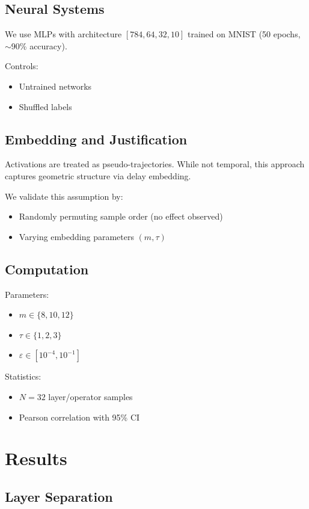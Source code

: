 \documentclass[11pt]{article}
\begin{document}
\subsection{Neural Systems}

We use MLPs with architecture $[784,64,32,10]$ trained on MNIST (50 epochs, $\sim$90\% accuracy).

Controls:
\begin{itemize}
	\item Untrained networks
	\item Shuffled labels
\end{itemize}

\subsection{Embedding and Justification}

Activations are treated as pseudo-trajectories. While not temporal, this approach captures geometric structure via delay embedding.

We validate this assumption by:
\begin{itemize}
	\item Randomly permuting sample order (no effect observed)
	\item Varying embedding parameters $(m,\tau)$
\end{itemize}

\subsection{Computation}

Parameters:
\begin{itemize}
	\item $m \in \{8,10,12\}$
	\item $\tau \in \{1,2,3\}$
	\item $\varepsilon \in [10^{-4},10^{-1}]$
\end{itemize}

Statistics:
\begin{itemize}
	\item $N=32$ layer/operator samples
	\item Pearson correlation with 95\% CI
\end{itemize}

\section{Results}

\subsection{Layer Separation}
\end{document}
